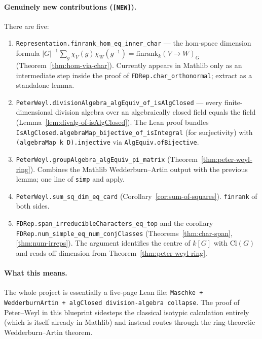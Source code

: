 \paragraph{Genuinely new contributions (\texttt{[NEW]}).}
There are five:
\begin{enumerate}
  \item \texttt{Representation.finrank\_hom\_eq\_inner\_char} — the
    hom-space dimension formula
    $|G|^{-1}\sum_g \chi_V(g)\chi_W(g^{-1}) = \mathrm{finrank}_k(V \to W)_G$
    (Theorem~\ref{thm:hom-via-char}). Currently appears in Mathlib only as
    an intermediate step inside the proof of \texttt{FDRep.char\_orthonormal};
    extract as a standalone lemma.
  \item \texttt{PeterWeyl.divisionAlgebra\_algEquiv\_of\_isAlgClosed} — every
    finite-dimensional division algebra over an algebraically closed field
    equals the field (Lemma~\ref{lem:divalg-of-isAlgClosed}). The Lean proof
    bundles \texttt{IsAlgClosed.algebraMap\_bijective\_of\_isIntegral} (for
    surjectivity) with \texttt{(algebraMap k D).injective} via
    \texttt{AlgEquiv.ofBijective}.
  \item \texttt{PeterWeyl.groupAlgebra\_algEquiv\_pi\_matrix}
    (Theorem~\ref{thm:peter-weyl-ring}). Combines the Mathlib
    Wedderburn–Artin output with the previous lemma; one line of \texttt{simp}
    and apply.
  \item \texttt{PeterWeyl.sum\_sq\_dim\_eq\_card}
    (Corollary~\ref{cor:sum-of-squares}). \texttt{finrank} of both sides.
  \item \texttt{FDRep.span\_irreducibleCharacters\_eq\_top} and the corollary
    \texttt{FDRep.num\_simple\_eq\_num\_conjClasses}
    (Theorems~\ref{thm:char-span}, \ref{thm:num-irreps}). The argument
    identifies the centre of $k[G]$ with $\mathrm{Cl}(G)$ and reads off
    dimension from Theorem~\ref{thm:peter-weyl-ring}.
\end{enumerate}

\paragraph{What this means.}
The whole project is essentially a five-page Lean file:
\texttt{Maschke + WedderburnArtin + algClosed division-algebra collapse}.
The proof of Peter–Weyl in this blueprint sidesteps the classical isotypic
calculation entirely (which is itself already in Mathlib) and instead routes
through the ring-theoretic Wedderburn–Artin theorem.
